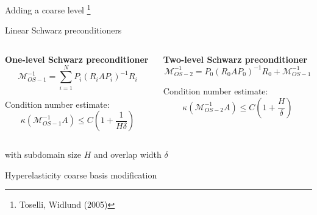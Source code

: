 \begin{frame}[noframenumbering]{Adding a coarse level \footnote{\tiny Toselli, Widlund (2005)}}

	{\Large Linear Schwarz preconditioners}
	\vspace*{4mm}
	\begin{columns}
		\begin{column}{0.5\textwidth}
			{\bf One-level Schwarz preconditioner}
			\begin{equation*}
				\mathcal{M}^{-1}_{OS-1}=\sum_{i=1}^{N}P_i(R_iAP_i)^{-1}R_i
			\end{equation*}
			\begin{block}{\normalsize Condition number estimate:}
				\begin{equation*}
					\kappa(\mathcal{M}^{-1}_{OS-1}A)\leq C(1+\frac{1}{H\delta})
				\end{equation*}
			\end{block}
		\end{column}
		\begin{column}{0.5\textwidth}
			{\bf Two-level Schwarz preconditioner}
			\vspace*{3mm}
			\begin{equation*}
				\mathcal{M}^{-1}_{OS-2}=P_0(R_0AP_0)^{-1}R_0 + \mathcal{M}^{-1}_{OS-1}
			\end{equation*}
			\begin{block}{\normalsize Condition number estimate:}
				\begin{equation*}
					\kappa(\mathcal{M}^{-1}_{OS-2}A)\leq C(1+\frac{H}{\delta})
				\end{equation*}
			\end{block}
		\end{column}
	\end{columns}
	\vspace*{4mm}
	\centering
	with subdomain size $H$ and overlap width $\delta$
\end{frame}

\begin{frame}[noframenumbering]{Hyperelasticity coarse basis modification}
	\centering
	\vspace{10mm}
	\only<1>{
		
	}
	\only<2>{
		
	}
\end{frame}


